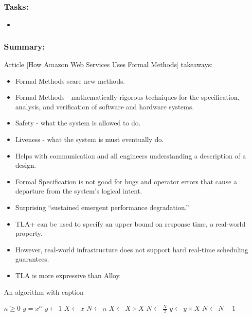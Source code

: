 \documentclass[11pt]{article}
\begin{document}
\subsubsection*{Tasks:}
\begin{itemize}
  \item
\end{itemize}

\subsubsection*{Summary:}
Article [How Amazon Web Services Uses Formal Methods] takeaways:
\begin{itemize}
  \item Formal Methods scare new methods.
  \item Formal Methods - mathematically rigorous techniques for the specification, analysis, and verification of software and hardware systems. 
  \item Safety - what the system is allowed to do.
  \item Liveness  - what the system is must eventually do.
  \item Helps with communication and all engineers understanding a description of a design.
  \item Formal Specification is not good for bugs and operator errors that cause a departure from the system’s logical intent.
  \item Surprising “sustained emergent performance degradation.”
  \item TLA+ can be used to specify an upper bound on response time, a real-world property.
  \item However, real-world infrastructure does not support hard real-time scheduling guarantees.
  \item TLA is more expressive than Alloy.
\end{itemize}

\begin{algorithm}
    \caption{An algorithm with caption}\label{alg:cap}
    \begin{algorithmic}
    \Require $n \geq 0$
    \Ensure $y = x^n$
    \State $y \gets 1$
    \State $X \gets x$
    \State $N \gets n$
        \State $X \gets X \times X$
        \State $N \gets \frac{N}{2}$  
        \State $y \gets y \times X$
        \State $N \gets N - 1$
    \EndIf
    \EndWhile
    \end{algorithmic}
\end{algorithm}
\end{document}
